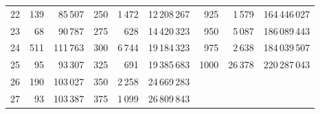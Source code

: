 \begin{center}
\begin{tabular}{@{}rrr@{\qquad}rrr@{\qquad}rrr@{}}
22 & 139 & 85\,507 & 250 & 1\,472 & 12\,208\,267 & 925 & 1\,579 & 164\,446\,027\\
23 & 68 & 90\,787 & 275 & 628 & 14\,420\,323 & 950 & 5\,087 & 186\,089\,443\\
24 & 511 & 111\,763 & 300 & 6\,744 & 19\,184\,323 & 975 & 2\,638 & 184\,039\,507\\
25 & 95 & 93\,307 & 325 & 691 & 19\,385\,683 & 1000 & 26\,378 & 220\,287\,043\\
26 & 190 & 103\,027 & 350 & 2\,258 & 24\,669\,283 &  &  & \\
27 & 93 & 103\,387 & 375 & 1\,099 & 26\,809\,843 &  &  & \\
\bottomrule
\end{tabular}
\end{center}
